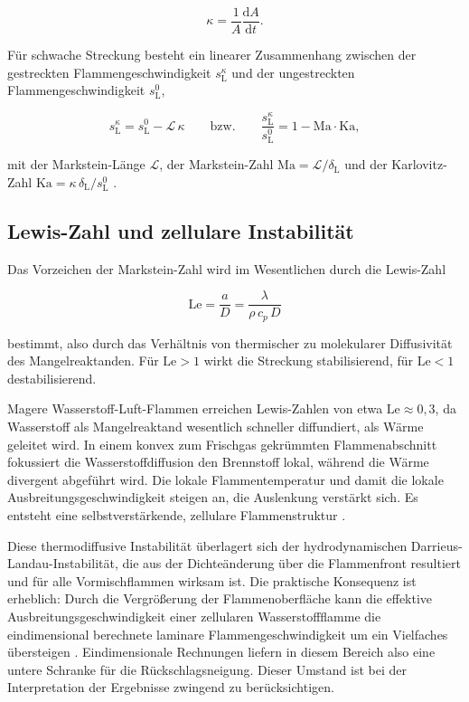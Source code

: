 \begin{equation}
	\label{eq:streckungsrate}
	\kappa = \frac{1}{A}\frac{\mathrm{d}A}{\mathrm{d}t}.
\end{equation}

Für schwache Streckung besteht ein linearer Zusammenhang zwischen der
gestreckten Flammengeschwindigkeit $s_\mathrm{L}^{\kappa}$ und der
ungestreckten Flammengeschwindigkeit $s_\mathrm{L}^{0}$,

\begin{equation}
	\label{eq:markstein}
	s_\mathrm{L}^{\kappa} = s_\mathrm{L}^{0} - \mathcal{L}\,\kappa
	\qquad\text{bzw.}\qquad
	\frac{s_\mathrm{L}^{\kappa}}{s_\mathrm{L}^{0}}
	= 1 - \mathrm{Ma}\cdot\mathrm{Ka},
\end{equation}

mit der Markstein-Länge $\mathcal{L}$, der Markstein-Zahl
$\mathrm{Ma} = \mathcal{L}/\delta_\mathrm{L}$ und der Karlovitz-Zahl
$\mathrm{Ka} = \kappa\,\delta_\mathrm{L}/s_\mathrm{L}^{0}$
\cite{Poinsot_2011, Matalon_2007}.

\subsection{Lewis-Zahl und zellulare Instabilität}\label{subsec:lewis}

Das Vorzeichen der Markstein-Zahl wird im Wesentlichen durch die Lewis-Zahl

\begin{equation}
	\label{eq:lewis}
	\mathrm{Le} = \frac{a}{D} = \frac{\lambda}{\rho\,c_p\,D}
\end{equation}

bestimmt, also durch das Verhältnis von thermischer zu molekularer
Diffusivität des Mangelreaktanden. Für $\mathrm{Le} > 1$ wirkt die Streckung
stabilisierend, für $\mathrm{Le} < 1$ destabilisierend.

Magere Wasserstoff-Luft-Flammen erreichen Lewis-Zahlen von etwa
$\mathrm{Le} \approx 0{,}3$, da Wasserstoff als Mangelreaktand wesentlich
schneller diffundiert, als Wärme geleitet wird. In einem konvex zum Frischgas
gekrümmten Flammenabschnitt fokussiert die Wasserstoffdiffusion den Brennstoff
lokal, während die Wärme divergent abgeführt wird. Die lokale
Flammentemperatur und damit die lokale Ausbreitungsgeschwindigkeit steigen an,
die Auslenkung verstärkt sich. Es entsteht eine selbstverstärkende, zellulare
Flammenstruktur \cite{Matalon_2007, Berger_2022}.

Diese thermodiffusive Instabilität überlagert sich der hydrodynamischen
Darrieus-Landau-Instabilität, die aus der Dichteänderung über die Flammenfront
resultiert und für alle Vormischflammen wirksam ist. Die praktische Konsequenz
ist erheblich: Durch die Vergrößerung der Flammenoberfläche kann die effektive
Ausbreitungsgeschwindigkeit einer zellularen Wasserstoffflamme die
eindimensional berechnete laminare Flammengeschwindigkeit um ein Vielfaches
übersteigen \cite{Frouzakis_2015, Berger_2022}. Eindimensionale Rechnungen
liefern in diesem Bereich also eine untere Schranke für die Rückschlagsneigung.
Dieser Umstand ist bei der Interpretation der Ergebnisse zwingend zu
berücksichtigen.


